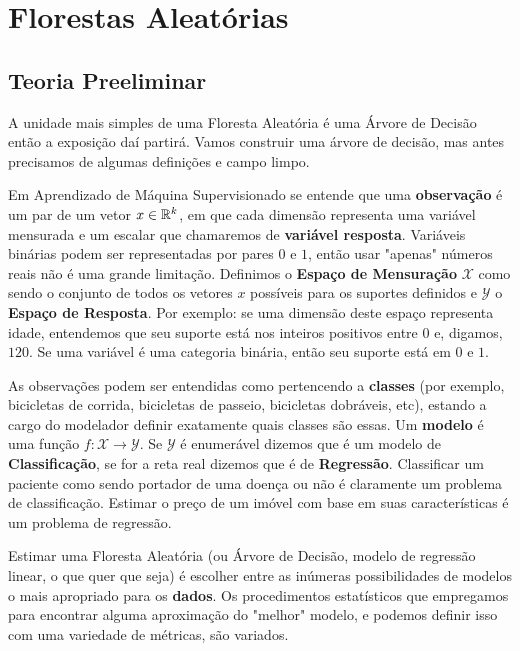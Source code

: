 
\chapter{Florestas Aleatórias}

\section{Teoria Preeliminar}

A unidade mais simples de uma Floresta Aleatória é uma Árvore de Decisão \cite{breiman2017classification} então a exposição daí partirá. Vamos construir uma árvore de decisão, mas antes precisamos de algumas definições e campo limpo. 

Em Aprendizado de Máquina Supervisionado se entende que uma \textbf{observação} é um par de um vetor $x \in \mathbb{R}^k$, em que cada dimensão representa uma variável mensurada e um escalar que chamaremos de \textbf{variável resposta}. Variáveis binárias podem ser representadas por pares $0$ e $1$, então usar "apenas" números reais não é uma grande limitação. Definimos o \textbf{Espaço de Mensuração} $\mathcal{X}$ como sendo o conjunto de todos os vetores $x$ possíveis para os suportes definidos e $\mathcal{Y}$ o \textbf{Espaço de Resposta}. Por exemplo: se uma dimensão deste espaço representa idade, entendemos que seu suporte está nos inteiros positivos entre $0$ e, digamos, $120$. Se uma variável é uma categoria binária, então seu suporte está em $0$ e $1$. 

As observações podem ser entendidas como pertencendo a \textbf{classes} (por exemplo, bicicletas de corrida, bicicletas de passeio, bicicletas dobráveis, etc), estando a cargo do modelador definir exatamente quais classes são essas. Um \textbf{modelo} é uma função $f: \mathcal{X} \to \mathcal{Y}$. Se $\mathcal{Y}$ é enumerável dizemos que é um modelo de \textbf{Classificação}, se for a reta real dizemos que é de \textbf{Regressão}. Classificar um paciente como sendo portador de uma doença ou não é claramente um problema de classificação. Estimar o preço de um imóvel com base em suas características é um problema de regressão. 

Estimar uma Floresta Aleatória (ou Árvore de Decisão, modelo de regressão linear, o que quer que seja) é  escolher entre as inúmeras possibilidades de modelos o mais apropriado para os \textbf{dados}. Os procedimentos estatísticos que empregamos para encontrar alguma aproximação do "melhor" modelo, e podemos definir isso com uma variedade de métricas, são variados.


